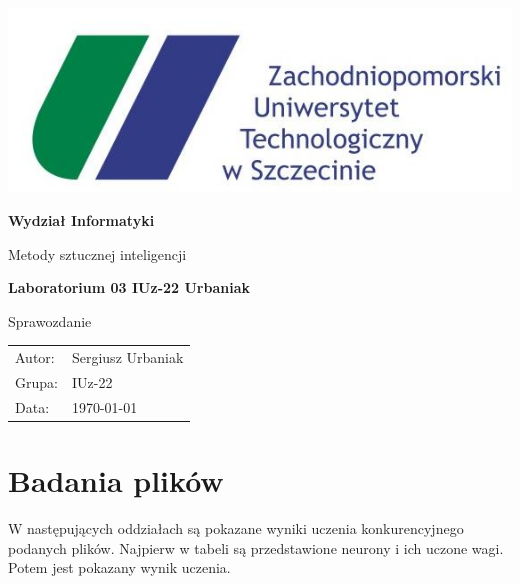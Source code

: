 \documentclass[pointlessnumbers, abstracton, headsepline, a4paper]{scrartcl}
\let\myTOC\tableofcontents
\renewcommand\tableofcontents{\myTOC\clearpage\pagenumbering{arabic}}
\begin{document}
\begin{titlepage}

\begin{center}
\includegraphics[scale=0.5]{logos/zut.jpg}
\par
\end{center}

\begin{center}
\textsf{\textbf{\LARGE Wydział Informatyki}}
\end{center}{\LARGE}

\vspace{1.5cm}

\begin{center}
\textsf{\Large Metody sztucznej inteligencji}
\end{center}

\begin{center}
\textsf{\textbf{\Large Laboratorium 03 IUz-22 Urbaniak}}
\end{center}

\begin{center}
\textsf{\large Sprawozdanie}
\end{center}

\vspace{3.5cm}

\begin{center}
\begin{tabular}{ll}
Autor: & Sergiusz Urbaniak\tabularnewline
Grupa: & IUz-22\tabularnewline
Data: & \today\tabularnewline
\end{tabular}
\end{center}

\end{titlepage}

\tableofcontents

\section{Badania plików}
W następujących oddziałach są pokazane wyniki uczenia konkurencyjnego podanych plików. Najpierw w tabeli są przedstawione neurony i ich uczone wagi. Potem jest pokazany wynik uczenia.
\end{document}
